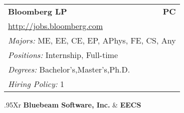 \documentclass[twoside]{article}
\begin{document}
\begin{center}
\begin{multicols}{3}
\begin{FlushLeft}
\begin{minipage}{.9\columnwidth}
\end{minipage}
 
\begin{minipage}{.9\columnwidth}\begin{tabularx}{.95\columnwidth}{Xr}
                 {\Large\bf Bloomberg LP} & {\Large\bf PC}\\
    \multicolumn{2}{p{.95\columnwidth}}{\url{http://jobs.bloomberg.com}}\\
    \multicolumn{2}{p{.95\columnwidth}}{\emph{Majors:} ME, EE, CE, EP, APhys, FE, CS, Any}\\
    \multicolumn{2}{p{.95\columnwidth}}{\emph{Positions:} Internship, Full-time}\\
    \multicolumn{2}{p{.95\columnwidth}}{\emph{Degrees:} Bachelor's,Master's,Ph.D.}\\
    \multicolumn{2}{p{.95\columnwidth}}{\emph{Hiring Policy:} 1}\\
    \end{tabularx}
    
\end{minipage}
 
\begin{minipage}{.9\columnwidth}\begin{tabularx}{.95\columnwidth}{Xr}
                 {\Large\bf Bluebeam Software, Inc.} & {\Large\bf EECS}\\
    \\
    \\
    \\
    \\
    \\
    \end{tabularx}
    
\end{minipage}
 

\end{FlushLeft}
\end{multicols}
\end{center}
\end{document}
